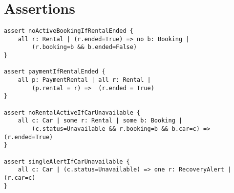 \newpage

\section{Assertions}

\lstset{language=alloy}

\begin{lstlisting}
assert noActiveBookingIfRentalEnded {
	all r: Rental | (r.ended=True) => no b: Booking |
		(r.booking=b && b.ended=False)
}

assert paymentIfRentalEnded {
	all p: PaymentRental | all r: Rental |
		(p.rental = r) =>  (r.ended = True)
}

assert noRentalActiveIfCarUnavailable {
	all c: Car | some r: Rental | some b: Booking |
		(c.status=Unavailable && r.booking=b && b.car=c) => (r.ended=True) 
}

assert singleAlertIfCarUnavailable {
	all c: Car | (c.status=Unavailable) => one r: RecoveryAlert | (r.car=c)
}
\end{lstlisting}
